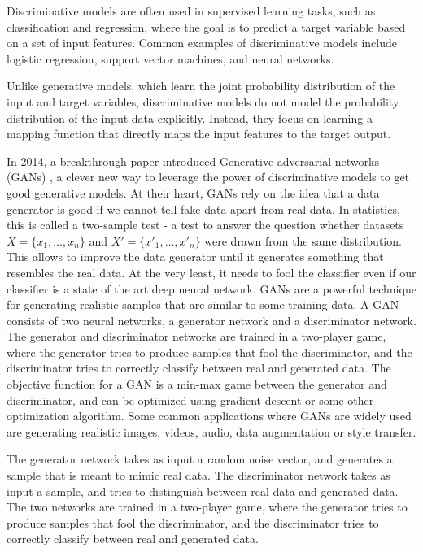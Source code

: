 Discriminative models are often used in supervised learning tasks, such as classification and regression, where the goal is to predict a target variable based on a set of input features. Common examples of discriminative models include logistic regression, support vector machines, and neural networks.

Unlike generative models, which learn the joint probability distribution of the input and target variables, discriminative models do not model the probability distribution of the input data explicitly. Instead, they focus on learning a mapping function that directly maps the input features to the target output.

In 2014, a breakthrough paper introduced Generative adversarial networks (GANs) \cite{goodfellow2020generative}, a clever new way to leverage the power of discriminative models to get good generative models. At their heart, GANs rely on the idea that a data generator is good if we cannot tell fake data apart from real data. In statistics, this is called a two-sample test - a test to answer the question whether datasets $X=\{x_1,\ldots, x_n\}$ and $X'=\{x'_1,\ldots, x'_n\}$ were drawn from the same distribution. This allows to improve the data generator until it generates something that resembles the real data. At the very least, it needs to fool the classifier even if our classifier is a state of the art deep neural network. GANs are a powerful technique for generating realistic samples that are similar to some training data. A GAN consists of two neural networks, a generator network and a discriminator network. The generator and discriminator networks are trained in a two-player game, where the generator tries to produce samples that fool the discriminator, and the discriminator tries to correctly classify between real and generated data. The objective function for a GAN is a min-max game between the generator and discriminator, and can be optimized using gradient descent or some other optimization algorithm. Some common applications where GANs are widely used are generating realistic images, videos, audio, data augmentation or style transfer.

The generator network takes as input a random noise vector, and generates a sample that is meant to mimic real data. The discriminator network takes as input a sample, and tries to distinguish between real data and generated data. The two networks are trained in a two-player game, where the generator tries to produce samples that fool the discriminator, and the discriminator tries to correctly classify between real and generated data.

